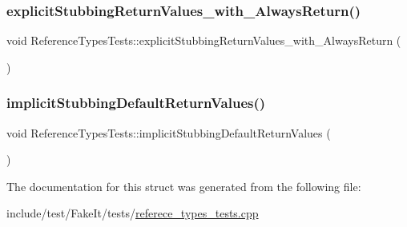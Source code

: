 \mbox{\label{structReferenceTypesTests_a7ed10950eea26a97a5463dd6bd487b62}} 
\subsubsection{\texorpdfstring{explicitStubbingReturnValues\_with\_AlwaysReturn()}{explicitStubbingReturnValues\_with\_AlwaysReturn()}}
{\footnotesize\ttfamily void Reference\+Types\+Tests\+::explicit\+Stubbing\+Return\+Values\+\_\+with\+\_\+\+Always\+Return (\begin{DoxyParamCaption}{ }\end{DoxyParamCaption})\hspace{0.3cm}{\ttfamily [inline]}}

\mbox{\label{structReferenceTypesTests_a8bb0299b4636688692937d136c5e2d06}} 
\subsubsection{\texorpdfstring{implicitStubbingDefaultReturnValues()}{implicitStubbingDefaultReturnValues()}}
{\footnotesize\ttfamily void Reference\+Types\+Tests\+::implicit\+Stubbing\+Default\+Return\+Values (\begin{DoxyParamCaption}{ }\end{DoxyParamCaption})\hspace{0.3cm}{\ttfamily [inline]}}



The documentation for this struct was generated from the following file\+:\begin{DoxyCompactItemize}
\item 
include/test/\+Fake\+It/tests/\mbox{\hyperlink{referece__types__tests_8cpp}{referece\+\_\+types\+\_\+tests.\+cpp}}\end{DoxyCompactItemize}
